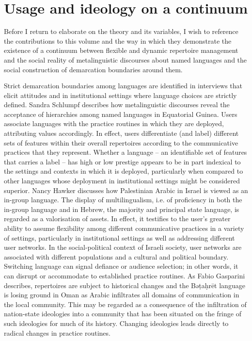 \documentclass[output=paper]{langscibook}
\begin{document}
\section{Usage and ideology on a continuum}
Before I return to elaborate on the theory and its variables, I wish to reference the contributions to this volume and the way in which they demonstrate the existence of a continuum between flexible and dynamic repertoire management and the social reality of metalinguistic discourses about named languages and the social construction of demarcation boundaries around them. 

Strict demarcation boundaries among languages are identified in interviews that elicit attitudes and in institutional settings where language choices are strictly defined. Sandra Schlumpf describes how metalinguistic discourses reveal the acceptance of hierarchies among named languages in Equatorial Guinea. Users associate languages with the practice routines in which they are deployed, attributing values accordingly. In effect, users differentiate (and label) different sets of features within their overall repertoires according to the communicative practices that they represent. Whether a language – an identifiable set of features that carries a label – has high or low prestige appears to be in part indexical to the settings and contexts in which it is deployed, particularly when compared to other languages whose deployment in institutional settings might be considered superior. Nancy Hawker discusses how Palestinian Arabic in Israel is viewed as an in-group language. The display of multilingualism, i.e. of proficiency in both the in-group language and in Hebrew, the majority and principal state language, is regarded as a valorisation of assets. In effect, it testifies to the user’s greater ability to assume flexibility among different communicative practices in a variety of settings, particularly in institutional settings as well as addressing different user networks. In the social-political context of Israeli society, user networks are associated with different populations and a cultural and political boundary. Switching language can signal defiance or audience selection; in other words, it can disrupt or accommodate to established practice routines. As Fabio Gasparini describes, repertoires are subject to historical changes and the Bəṭaḥrēt language is losing ground in Oman as Arabic infiltrates all domains of communication in the local community. This may be regarded as a consequence of the infiltration of nation-state ideologies into a community that has been situated on the fringe of such ideologies for much of its history. Changing ideologies leads directly to radical changes in practice routines.
\end{document}
